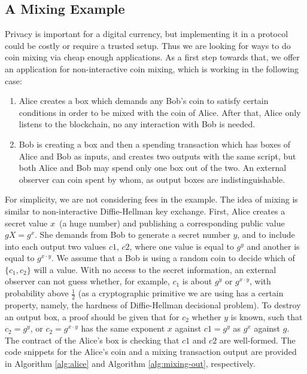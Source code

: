 
\subsection{A Mixing Example}
 \label{sec:platform}

 Privacy is important for a digital currency, but implementing it in a protocol could be costly or require a trusted
 setup. Thus we are looking for ways to do coin mixing via cheap enough applications. As a first step towards that, we
 offer an application for non-interactive coin mixing, which is working in the following case:
 \begin{enumerate}
    \item{} Alice creates a box which demands any Bob's coin to satisfy certain conditions in order to be mixed with
    the coin of Alice. After that, Alice only listens to the blockchain, no any interaction with Bob is needed.
    \item{} Bob is creating a box and then a spending transaction which has boxes of Alice and Bob as inputs,
     and creates two outputs with the same script, but both Alice and Bob may spend only one box out of the two.
     An external observer can coin spent by whom, as output boxes are indistinguishable.
 \end{enumerate}

 For simplicity, we are not considering fees in the example. The idea of mixing is similar to non-interactive
 Diffie-Hellman key exchange. First, Alice creates a secret value $x$~(a huge number) and publishing a corresponding
 public value $gX = g^x$. She demands from Bob to generate a secret number $y$, and to include into each output two
 values $c1$, $c2$, where one value is equal to $g^y$ and another is equal to $g^{x \cdot y}$. We assume that a Bob is using
 a random coin to decide which of $\{c_1, c_2\}$ will a value. With no access to the secret information, an external
 observer can not guess whether, for example, $c_1$ is about $g^y$ or $g^{x \cdot y}$, with probability above
 $\frac{1}{2}$ (as a cryptographic primitive we are using has a certain property, namely, the hardness of
 Diffie-Hellman decisional problem). To destroy an output box, a proof should be given that for $c_2$ whether $y$ is known,
  such that $c_2 = g^y$, or $c_2 = g^{x \cdot y}$ has the same exponent $x$ against $c1 = g^y$ as $g^x$ against $g$.
 The contract of the Alice's box is checking that $c1$ and $c2$ are well-formed. The code snippets for the Alice's coin and
 a mixing transaction output are provided in Algorithm \ref{alg:alice} and Algorithm \ref{alg:mixing-out}, respectively.

